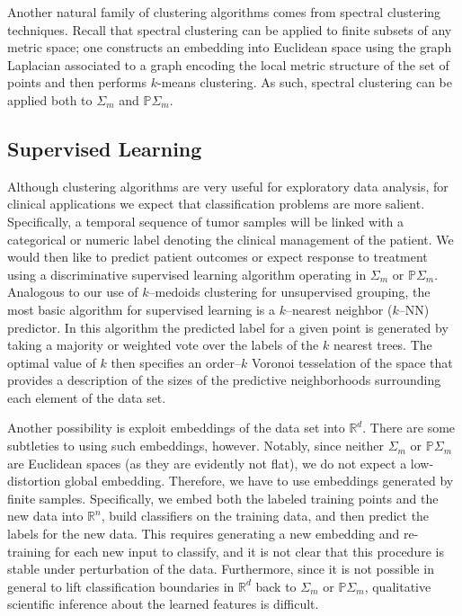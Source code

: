 \documentclass[a4paper,11pt]{article}
\begin{document}
Another natural family of clustering algorithms comes from spectral clustering techniques.
Recall that spectral clustering can be applied to finite subsets of any metric space; one constructs an embedding into Euclidean space using the graph Laplacian associated to a graph encoding the local metric structure of the set of points and then performs $k$-means clustering.
As such, spectral clustering can be applied both to $\Sigma_m$ and $\mathbb{P}\Sigma_m$.

\subsection{Supervised Learning}

Although clustering algorithms are very useful for exploratory data analysis, for clinical applications we expect that classification problems are more salient.
Specifically, a temporal sequence of tumor samples will be linked with a categorical or numeric label denoting the clinical management of the patient.
We would then like to predict patient outcomes or expect response to treatment using a discriminative supervised learning algorithm operating in $\Sigma_m$ or $\mathbb{P}\Sigma_m$.
Analogous to our use of $k$--medoids clustering for unsupervised grouping, the most basic algorithm for supervised learning is a $k$--nearest neighbor ($k$--NN) predictor.
In this algorithm the predicted label for a given point is generated by taking a majority or weighted vote over the labels of the $k$ nearest trees.
The optimal value of $k$ then specifies an order--$k$ Voronoi tesselation of the space that provides a description of the sizes of the predictive neighborhoods surrounding each element of the data set.

Another possibility is exploit embeddings of the data set into $\mathbb{R}^d$.
There are some subtleties to using such embeddings, however.
Notably, since neither $\Sigma_m$ or $\mathbb{P}\Sigma_m$ are Euclidean spaces (as they are evidently not flat), we do not expect a low-distortion global embedding.
Therefore, we have to use embeddings generated by finite samples.
Specifically, we embed both the labeled training points and the new data into $\mathbb{R}^n$, build classifiers on the training data, and then predict the labels for the new data.
This requires generating a new embedding and re-training for each new input to classify, and it is not clear that this procedure is stable under perturbation of the data.
Furthermore, since it is not possible in general to lift classification boundaries in $\mathbb{R}^d$ back to $\Sigma_m$ or $\mathbb{P}\Sigma_m$, qualitative scientific inference about the learned features is difficult.
\end{document}
